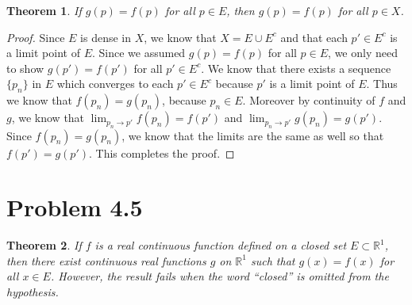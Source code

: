 \documentclass[psamsfonts]{amsart}
\newtheorem{thm}{Theorem}[section]
\theoremstyle{definition}
\theoremstyle{remark}
\numberwithin{equation}{section}
\begin{document}
\begin{thm}
If $g(p) = f(p)$ for all $p \in E$, then $g(p) = f(p)$ for all $p \in X$.
\end{thm}

\begin{proof}
Since $E$ is dense in $X$, we know that $ X = E \cup E^c$ and that each $p' \in E^c$ is a limit point of $E$. Since we assumed $g(p) = f(p)$ for all $p \in E$, we only need to show $g(p') = f(p')$ for all $p' \in E^c$. We know that there exists a sequence $\{ p_n \}$ in $E$ which converges to each $p' \in E^c$ because $p'$ is a limit point of $E$. Thus we know that $f(p_n) = g(p_n)$, because $p_n \in E$. Moreover by continuity of $f$ and $g$, we know that $\lim_{p_n \to p'} f(p_n) = f(p')$ and $\lim_{p_n \to p'} g(p_n) = g(p')$. Since $f(p_n) = g(p_n)$, we know that the limits are the same as well so that $f(p') = g(p')$. This completes the proof.
\end{proof}

\section{Problem 4.5}

\begin{thm}
If $f$ is a real continuous function defined on a closed set $E \subset \mathbb{R}^1$, then there exist continuous real functions $g$ on $\mathbb{R}^1$ such that $g(x) = f(x)$ for all $x \in E$. However, the result fails when the word ``closed'' is omitted from the hypothesis.
\end{thm}
\end{document}
